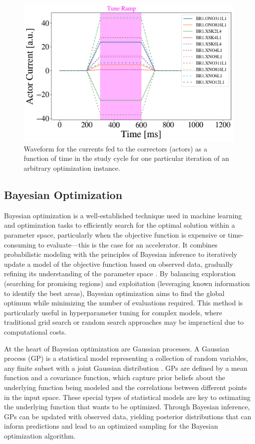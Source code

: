 \begin{figure}[H]
    \centering
    \includegraphics[width=\linewidth]{chapter5/actor_currents.png}
    \caption{Waveform for the currents fed to the correctors (actors) as a function of time in the study cycle for one particular iteration of an arbitrary optimization instance.}
    \label{fig:actorcurrents}
\end{figure}

\subsection{Bayesian Optimization}

Bayesian optimization is a well-established technique used in machine learning and optimization tasks to efficiently search for the optimal solution within a parameter space, particularly when the objective function is expensive or time-consuming to evaluate---this is the case for an accelerator. It combines probabilistic modeling with the principles of Bayesian inference to iteratively update a model of the objective function based on observed data, gradually refining its understanding of the parameter space \cite{bayesian}. By balancing exploration (searching for promising regions) and exploitation (leveraging known information to identify the best areas), Bayesian optimization aims to find the global optimum while minimizing the number of evaluations required. This method is particularly useful in hyperparameter tuning for complex models, where traditional grid search or random search approaches may be impractical due to computational costs.

At the heart of Bayesian optimization are Gaussian processes. A Gaussian process (GP) is a statistical model representing a collection of random variables, any finite subset with a joint Gaussian distribution \cite{bayesian}. GPs are defined by a mean function and a covariance function, which capture prior beliefs about the underlying function being modeled and the correlations between different points in the input space. These special types of statistical models are key to estimating the underlying function that wants to be optimized. Through Bayesian inference, GPs can be updated with observed data, yielding posterior distributions that can inform predictions and lead to an optimized sampling for the Bayesian optimization algorithm. 

